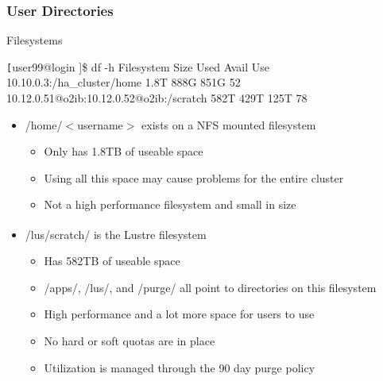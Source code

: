 \documentclass[t,hyperref={pdfpagelabels=false}]{beamer}
\newcommand{\ctilde}{{\fontfamily{ptm}\selectfont\texttildelow}}
\newcommand{\regtrademark}{\fontsize{5}{6}\selectfont \textsuperscript{\textregistered}}
\newcommand{\lustre}{Lustre{\regtrademark}}
\begin{document}
\begin{frame}[fragile]
\frametitle{User Directories}
\begin{block}{Filesystems}
\begin{semiverbatim}\tiny \texttt
[user99@login \ctilde]\$ df -h
Filesystem                                  Size  Used Avail Use%
10.10.0.3:/ha_cluster/home                  1.8T  888G  851G  52%
10.12.0.51@o2ib:10.12.0.52@o2ib:/scratch    582T  429T  125T  78%
\end{semiverbatim}
\end{block}
	\begin{itemize}\footnotesize
		\item /home/$<$username$>$ exists on a NFS mounted filesystem
		\begin{itemize}\tiny
			\item Only has 1.8TB of useable space
			\item Using all this space may cause problems for the entire cluster
			\item Not a high performance filesystem and small in size
		\end{itemize}
		\item /lus/scratch/ is the {\lustre} filesystem
		\begin{itemize}\tiny
			\item Has 582TB of useable space
			\item \ctilde{}/apps/, \ctilde{}/lus/, and \ctilde{}/purge/ all point to directories on this filesystem
			\item High performance and a lot more space for users to use
			\item No hard or soft quotas are in place
			\item Utilization is managed through the 90 day purge policy
		\end{itemize}
	\end{itemize}
\end{frame}
\end{document}
